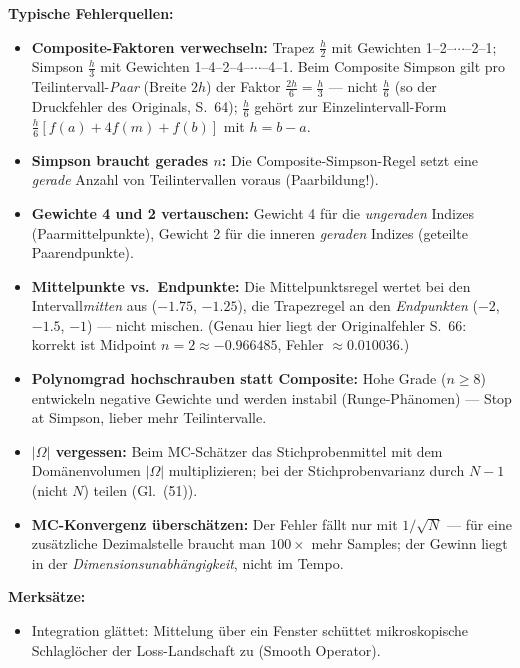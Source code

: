 \begin{merkbox}
\textbf{Typische Fehlerquellen:}
\begin{itemize}[itemsep=1pt]
  \item \textbf{Composite-Faktoren verwechseln:} Trapez $\frac{h}{2}$ mit Gewichten
        1--2--$\cdots$--2--1; Simpson $\frac{h}{3}$ mit Gewichten
        1--4--2--4--$\cdots$--4--1. Beim Composite Simpson gilt pro
        Teilintervall-\emph{Paar} (Breite $2h$) der Faktor $\frac{2h}{6} =
        \frac{h}{3}$ --- nicht $\frac{h}{6}$ (so der Druckfehler des Originals,
        S.~64); $\frac{h}{6}$ gehört zur Einzelintervall-Form
        $\frac{h}{6}[f(a)+4f(m)+f(b)]$ mit $h = b-a$.
  \item \textbf{Simpson braucht gerades $n$:} Die Composite-Simpson-Regel setzt eine
        \emph{gerade} Anzahl von Teilintervallen voraus (Paarbildung!).
  \item \textbf{Gewichte 4 und 2 vertauschen:} Gewicht 4 für die \emph{ungeraden}
        Indizes (Paarmittelpunkte), Gewicht 2 für die inneren \emph{geraden} Indizes
        (geteilte Paarendpunkte).
  \item \textbf{Mittelpunkte vs.\ Endpunkte:} Die Mittelpunktsregel wertet bei den
        Intervall\emph{mitten} aus ($-1.75$, $-1.25$), die Trapezregel an den
        \emph{Endpunkten} ($-2$, $-1.5$, $-1$) --- nicht mischen. (Genau hier liegt
        der Originalfehler S.~66: korrekt ist Midpoint $n{=}2 \approx -0.966485$,
        Fehler $\approx 0.010036$.)
  \item \textbf{Polynomgrad hochschrauben statt Composite:} Hohe Grade ($n \ge 8$)
        entwickeln negative Gewichte und werden instabil (Runge-Phänomen) ---
        \glqq Stop at Simpson\grqq, lieber mehr Teilintervalle.
  \item \textbf{$|\Omega|$ vergessen:} Beim MC-Schätzer das Stichprobenmittel mit dem
        Domänenvolumen $|\Omega|$ multiplizieren; bei der Stichprobenvarianz durch
        $N-1$ (nicht $N$) teilen (Gl.~(51)).
  \item \textbf{MC-Konvergenz überschätzen:} Der Fehler fällt nur mit $1/\sqrt{N}$
        --- für eine zusätzliche Dezimalstelle braucht man $100\times$ mehr Samples;
        der Gewinn liegt in der \emph{Dimensionsunabhängigkeit}, nicht im Tempo.
\end{itemize}
\textbf{Merksätze:}
\begin{itemize}[itemsep=1pt]
  \item Integration glättet: Mittelung über ein Fenster schüttet mikroskopische
        Schlaglöcher der Loss-Landschaft zu (\glqq Smooth Operator\grqq).

\end{itemize}
\end{merkbox}
